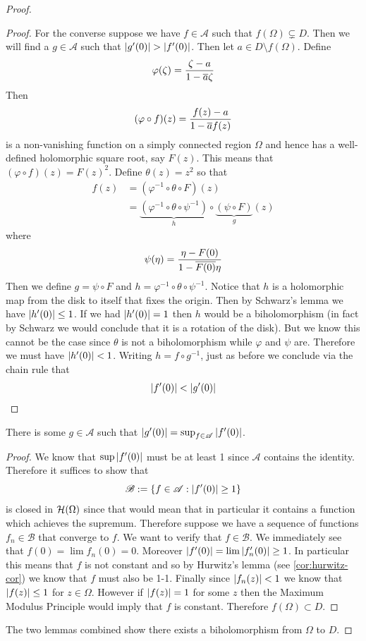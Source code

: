 \begin{proof}
\begin{proof}
        For the converse suppose we have $f \in \mathscr{A}$ such that $f(\Omega) \subsetneq D$. Then we will find a $g \in \mathscr{A}$ such that $\left|g'(0)\right| > \left|f'(0)\right|$. Then let $a \in D \setminus f(\Omega)$. Define
        $$\varphi(\zeta) = \frac{\zeta - a}{1 - \overline{a} \zeta}$$
        Then
        $$(\varphi \circ f)(z) = \frac{f(z) - a}{1 - \overline{a}f(z)}$$
        is a non-vanishing function on a simply connected region $\Omega$ and hence has a well-defined holomorphic square root, say $F(z)$. This means that $(\varphi \circ f)(z) = F(z)^2$. Define $\theta(z) = z^2$ so that 
        \begin{align*}
            f(z) &= (\varphi^{-1} \circ \theta \circ F)(z)\\ 
            &= \underbrace{(\varphi^{-1} \circ \theta \circ \psi^{-1})}_{h} \circ \underbrace{(\psi \circ F)}_{g}(z)
        \end{align*}
        where
        $$\psi(\eta) = \frac{\eta - F(0)}{1 - \overline{F(0)}\eta}$$
        Then we define $g = \psi \circ F$ and $h = \varphi^{-1} \circ \theta \circ \psi^{-1}$. Notice that $h$ is a holomorphic map from the disk to itself that fixes the origin. Then by Schwarz's lemma we have $\left|h'(0)\right| \leq 1$. If we had $\left|h'(0)\right| = 1$ then $h$ would be a biholomorphism (in fact by Schwarz we would conclude that it is a rotation of the disk). But we know this cannot be the case since $\theta$ is not a biholomorphism while $\varphi$ and $\psi$ are. Therefore we must have $\left|h'(0)\right| < 1$. Writing $h = f \circ g^{-1}$, just as before we conclude via the chain rule that 
        $$\left|f'(0)\right| < \left|g'(0)\right|$$
    \end{proof}
    
    \begin{lemma}
        There is some $g \in \mathscr{A}$ such that $\left|g'(0)\right| = \sup_{f \in \mathscr{A}} \left|f'(0)\right|$.
    \end{lemma}
    \begin{proof}
        We know that $\sup \left|f'(0)\right|$ must be at least 1 since $\mathscr{A}$ contains the identity. Therefore it suffices to show that 
        $$\mathscr{B} := \{ f \in \mathscr{A} : \left|f'(0)\right| \geq 1 \}$$
        is closed in $\mathcal{H}(\Omega)$ since that would mean that in particular it contains a function which achieves the supremum. Therefore suppose we have a sequence of functions $f_n \in \mathscr{B}$ that converge to $f$. We want to verify that $f \in \mathscr{B}$. We immediately see that $f(0) = \lim f_n(0) = 0$. Moreover $\left|f'(0)\right| = \lim \left|f_n'(0)\right| \geq 1$. In particular this means that $f$ is not constant and so by Hurwitz's lemma (see \autoref{cor:hurwitz-cor}) we know that $f$ must also be 1-1. Finally since $\left|f_n(z)\right| < 1$ we know that $\left|f(z)\right| \leq 1$ for $z \in \Omega$. However if $\left|f(z)\right| = 1$ for some $z$ then the Maximum Modulus Principle would imply that $f$ is constant. Therefore $f(\Omega) \subset D$. 
    \end{proof}
    The two lemmas combined show there exists a biholomorphism from $\Omega$ to $D$.
\end{proof}

